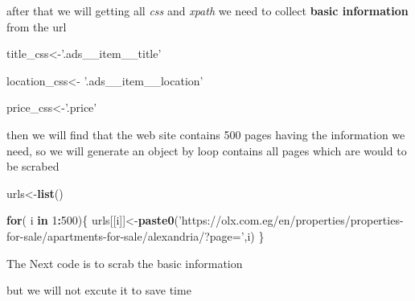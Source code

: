\documentclass[]{article}
\newenvironment{Shaded}{\begin{snugshade}}{\end{snugshade}}
\newcommand{\KeywordTok}[1]{\textcolor[rgb]{0.13,0.29,0.53}{\textbf{#1}}}
\newcommand{\DecValTok}[1]{\textcolor[rgb]{0.00,0.00,0.81}{#1}}
\newcommand{\StringTok}[1]{\textcolor[rgb]{0.31,0.60,0.02}{#1}}
\newcommand{\ControlFlowTok}[1]{\textcolor[rgb]{0.13,0.29,0.53}{\textbf{#1}}}
\newcommand{\OperatorTok}[1]{\textcolor[rgb]{0.81,0.36,0.00}{\textbf{#1}}}
\newcommand{\NormalTok}[1]{#1}
\begin{document}
after that we will getting all \emph{css} and \emph{xpath} we need to
collect \textbf{basic information} from the url

\begin{Shaded}
\begin{Highlighting}[]
\NormalTok{title_css<-}\StringTok{'.ads__item__title'}

\NormalTok{location_css<-}\StringTok{ '.ads__item__location'}

\NormalTok{price_css<-}\StringTok{'.price'}
\end{Highlighting}
\end{Shaded}

then we will find that the web site contains 500 pages having the
information we need, so we will generate an object by loop contains all
pages which are would to be scrabed

\begin{Shaded}
\begin{Highlighting}[]
\NormalTok{urls<-}\KeywordTok{list}\NormalTok{()}

\ControlFlowTok{for}\NormalTok{( i }\ControlFlowTok{in} \DecValTok{1}\OperatorTok{:}\DecValTok{500}\NormalTok{)\{}
\NormalTok{        urls[[i]]<-}\KeywordTok{paste0}\NormalTok{(}\StringTok{'https://olx.com.eg/en/properties/properties-for-sale/apartments-for-sale/alexandria/?page='}\NormalTok{,i)}
\NormalTok{\}}
\end{Highlighting}
\end{Shaded}

The Next code is to scrab the basic information

but we will not excute it to save time
\end{document}
